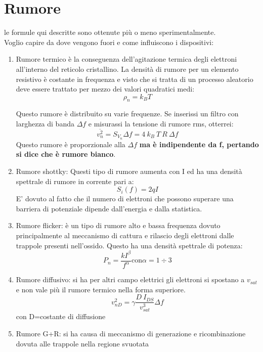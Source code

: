 \section{Rumore}
le formule qui descritte sono ottenute più o meno sperimentalmente.\\
Voglio capire da dove vengono fuori e come influiscono i dispositivi:
\begin{enumerate}
    \item Rumore termico è la conseguenza dell'agitazione termica degli elettroni all'interno del reticolo cristallino.
    La densità di rumore per un elemento resistivo è costante in frequenza e visto che si tratta di un processo aleatorio deve essere trattato per mezzo dei valori quadratici medi:
    \begin{equation}
        \rho_n= k_B T
    \end{equation}

    \begin{citbox}
    Questo rumore è distribuito su varie frequenze. Se inserissi un filtro con larghezza di banda $\Delta f$ e misurassi la tensione di rumore rms, otterrei:
    \begin{equation}
        \overline{v_n^2}=S_{V_n}\Delta f=4\ k_B\ T\ R\ \Delta f
    \end{equation}
    Questo rumore è proporzionale alla $\Delta f$ \textbf{ ma è indipendente da f, pertando si dice che è rumore bianco}.
    \end{citbox}
    
    \item Rumore shottky: Questi tipo di rumore aumenta con I ed ha una densità spettrale di rumore in corrente pari a:
    \[S_i(f)=2qI\]
    E' dovuto al fatto che il numero di elettroni che possono superare una barriera di potenziale dipende dall'energia e dalla statistica.
    
    \item Rumore flicker: è un tipo di rumore alto e bassa frequenza dovuto principalmente al meccanismo di cattura e rilascio degli elettroni dalle trappole presenti nell'ossido. Questo ha una densità spettrale di potenza:
    \[P_n=\dfrac{kI^{\beta}}{f^{\alpha}} \text{con} \alpha=1 \div 3\]

    \item Rumore diffusivo:
    si ha per altri campo elettrici gli elettroni si spostano a $v_{sat}$ e non vale più il rumore termico nella forma superiore.
    \[v_{nD}^2 = \gamma \dfrac{D\ I_{DS}}{v_{sat}^3}\Delta f\]
    con D=costante di diffusione
    
    \item Rumore G+R:
    si ha causa di meccanismo di generazione e ricombinazione dovuta alle trappole nella regione svuotata
    
\end{enumerate}


